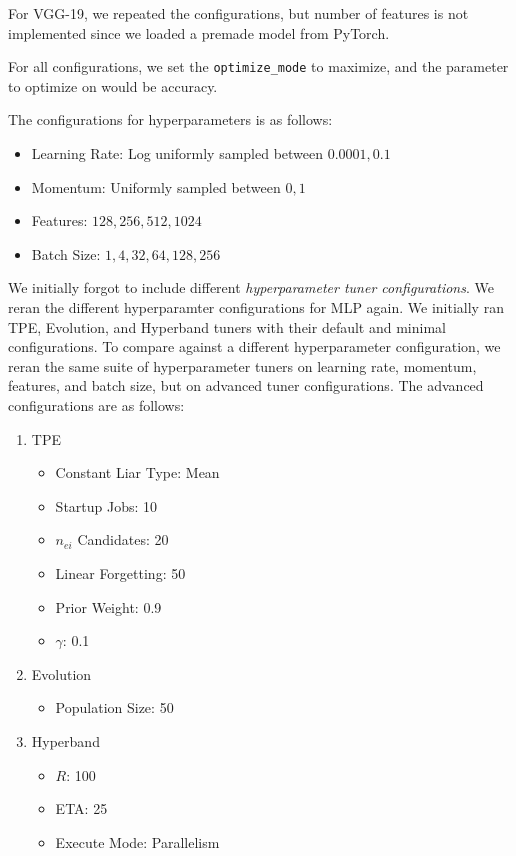 \documentclass{article}
\begin{document}
For VGG-19, we repeated the configurations, but number of features is not implemented since we loaded a premade model from PyTorch.

For all configurations, we set the \verb|optimize_mode| to maximize, and the parameter to optimize on would be accuracy.

The configurations for hyperparameters is as follows:
\begin{itemize}
	\item Learning Rate: Log uniformly sampled between $0.0001, 0.1$
	\item Momentum: Uniformly sampled between $0, 1$
	\item Features: $128, 256, 512, 1024$
	\item Batch Size: $1, 4, 32, 64, 128, 256$
\end{itemize}

We initially forgot to include different \textit{hyperparameter tuner configurations}. We reran the different hyperparamter configurations for MLP again. We initially ran TPE, Evolution, and Hyperband tuners with their default and minimal configurations. To compare against a different hyperparameter configuration, we reran the same suite of hyperparameter tuners on learning rate, momentum, features, and batch size, but on advanced tuner configurations. The advanced configurations are as follows:

\begin{enumerate}
	\item TPE
	      \begin{itemize}
		      \item Constant Liar Type: Mean
		      \item Startup Jobs: 10
		      \item $n_{ei}$ Candidates: 20
		      \item Linear Forgetting: 50
		      \item Prior Weight: 0.9
		      \item $\gamma$: 0.1
	      \end{itemize}
	\item Evolution
	      \begin{itemize}
		      \item Population Size: 50
	      \end{itemize}
	\item Hyperband
	      \begin{itemize}
		      \item $R$: 100
		      \item ETA: 25
		      \item Execute Mode: Parallelism
	      \end{itemize}
\end{enumerate}
\end{document}
